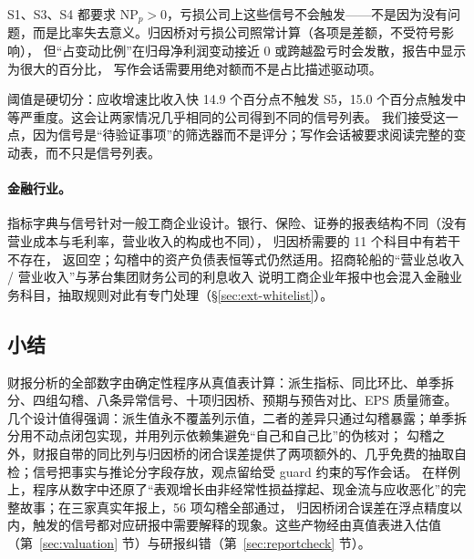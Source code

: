 \begin{failcase}[：亏损公司的信号与归因]
S1、S3、S4 都要求 $\text{NP}_p>0$，亏损公司上这些信号不会触发——不是因为没有问题，而是比率失去意义。归因桥对亏损公司照常计算（各项是差额，不受符号影响），
但“占变动比例”在归母净利润变动接近 0 或跨越盈亏时会发散，报告中显示为很大的百分比，
写作会话需要用绝对额而不是占比描述驱动项。
\end{failcase}

\begin{failcase}[：信号阈值的边界效应]
阈值是硬切分：应收增速比收入快 14.9 个百分点不触发 S5，15.0 个百分点触发中等严重度。这会让两家情况几乎相同的公司得到不同的信号列表。
我们接受这一点，因为信号是“待验证事项”的筛选器而不是评分；写作会话被要求阅读完整的变动表，而不只是信号列表。
\end{failcase}

\paragraph{金融行业。}
指标字典与信号针对一般工商企业设计。银行、保险、证券的报表结构不同（没有营业成本与毛利率，营业收入的构成也不同），
归因桥需要的 11 个科目中有若干不存在， 返回空；勾稽中的资产负债表恒等式仍然适用。招商轮船的“营业总收入 / 营业收入”与茅台集团财务公司的利息收入
说明工商企业年报中也会混入金融业务科目，抽取规则对此有专门处理（\S\ref{sec:ext-whitelist}）。

\subsection{小结}
\label{sec:an-summary}

财报分析的全部数字由确定性程序从真值表计算：派生指标、同比环比、单季拆分、四组勾稽、八条异常信号、十项归因桥、预期与预告对比、EPS 质量筛查。
几个设计值得强调：派生值永不覆盖列示值，二者的差异只通过勾稽暴露；单季拆分用不动点闭包实现，并用列示依赖集避免“自己和自己比”的伪核对；
勾稽之外，财报自带的同比列与归因桥的闭合误差提供了两项额外的、几乎免费的抽取自检；信号把事实与推论分字段存放，观点留给受 guard 约束的写作会话。
在样例上，程序从数字中还原了“表观增长由非经常性损益撑起、现金流与应收恶化”的完整故事；在三家真实年报上，56 项勾稽全部通过，
归因桥闭合误差在浮点精度以内，触发的信号都对应研报中需要解释的现象。这些产物经由真值表进入估值（第~\ref{sec:valuation} 节）与研报纠错（第~\ref{sec:reportcheck} 节）。
